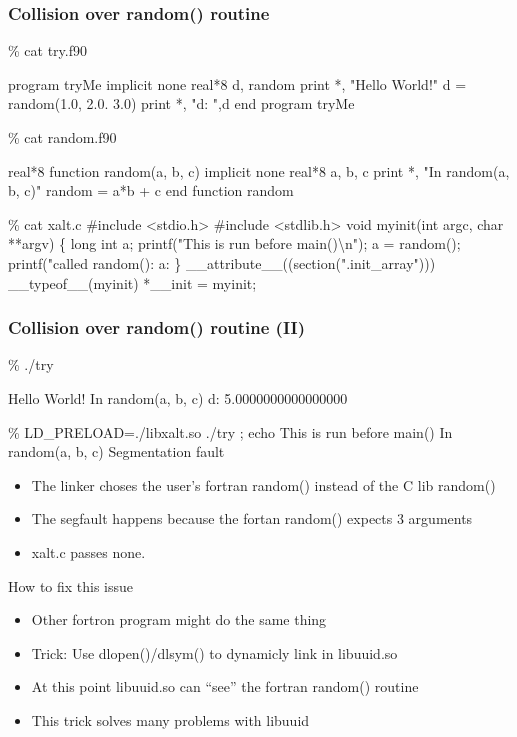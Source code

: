\documentclass{beamer}
\begin{document}
\begin{frame}[fragile]
    \frametitle{Collision over random() routine}
 {\tiny
    \begin{semiverbatim}
\% cat try.f90

program tryMe
   implicit none 
   real*8 d, random
   print *, "Hello World!"
   d = {\color{blue}{}random(1.0, 2.0. 3.0)}
   print *, "d: ",d
end program tryMe

\% cat random.f90

real*8 function {\color{blue}{}random(a, b, c)}
   implicit none
   real*8 a, b, c
   print *, "In random(a, b, c)"
   random = a*b + c
end function random

\% cat xalt.c
#include <stdio.h>
#include <stdlib.h>
void myinit(int argc, char **argv)
\{
  long int a;
  printf("This is run before main()\textbackslash{}n");
  a = {\color{red}{}random()};
  printf("called random(): a: %
\}
__attribute__((section(".init_array"))) __typeof__(myinit) *__init = myinit;

\end{semiverbatim}
}
\end{frame}

\begin{frame}[fragile]
    \frametitle{Collision over random() routine (II)}
 {\tiny
    \begin{semiverbatim}
\% ./try

 Hello World!
 In random(a, b, c)
 d:    5.0000000000000000     

\% LD_PRELOAD=./libxalt.so  ./try  ; echo
This is run before main()
 In random(a, b, c)
Segmentation fault
    \end{semiverbatim}
}
  \begin{itemize}
    \item The linker choses the user's fortran random() instead of the C lib
      random()
    \item The segfault happens because the fortan random() expects 3
      arguments
    \item xalt.c passes none.
  \end{itemize}

\end{frame}

\begin{frame}{How to fix this issue}
  \begin{itemize}
    \item Other fortron program might do the same thing
    \item Trick: Use dlopen()/dlsym() to dynamicly link in libuuid.so
    \item At this point libuuid.so can ``see'' the fortran random()
      routine
    \item This trick solves many problems with libuuid
  \end{itemize}
\end{frame}
\end{document}
